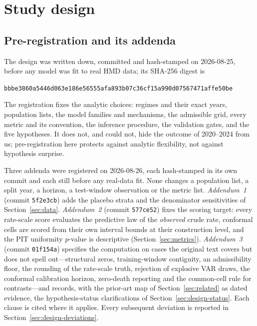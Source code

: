 \section{Study design}
\label{sec:design}

\subsection{Pre-registration and its addenda}
\label{sec:design-prereg}

The design was written down, committed and hash-stamped on 2026-08-25,
before any model was fit to real HMD data; its SHA-256 digest is
\begin{center}
\small\texttt{bbbe3860a5446d063e186e56555afa893b07c36cf15a990d07567471affe50be}
\end{center}
The registration fixes the analytic choices: regimes and their exact years,
population lists, the model families and mechanisms, the admissible grid,
every metric and its convention, the inference procedure, the validation
gates, and the five hypotheses. It does not, and could not, hide the outcome
of 2020--2024 from us; pre-registration here protects against analytic
flexibility, not against hypothesis surprise.

Three addenda were registered on 2026-08-26, each hash-stamped in its own
commit and each still before any real-data fit. None changes a population
list, a split year, a horizon, a test-window observation or the metric
list. \emph{Addendum~1} (commit \texttt{5f2e3cb}) adds the placebo strata
and the denominator sensitivities of Section~\ref{sec:data}.
\emph{Addendum~2} (commit \texttt{577ce52}) fixes the scoring target: every
rate-scale score evaluates the predictive law of the \emph{observed} crude
rate, conformal cells are scored from their own interval bounds at their
construction level, and the PIT uniformity $p$-value is descriptive
(Section~\ref{sec:metrics}). \emph{Addendum~3} (commit \texttt{01f154a})
specifies the computation on cases the original text covers but does not
spell out---structural zeros, training-window contiguity, an admissibility
floor, the rounding of the rate-scale truth, rejection of explosive VAR
draws, the conformal calibration horizon, zero-death reporting and the
common-cell rule for contrasts---and records, with the prior-art map of
Section~\ref{sec:related} as dated evidence, the hypothesis-status
clarifications of Section~\ref{sec:design-status}. Each clause is cited
where it applies. Every subsequent deviation is reported in
Section~\ref{sec:design-deviations}.

